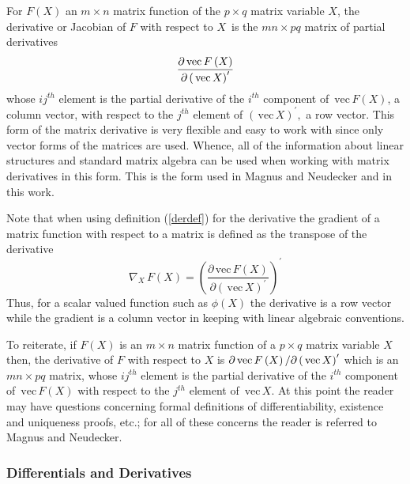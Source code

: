 \documentclass[12pt,thmsa,suthesis,verbatim]{report}
\begin{document}
For $F\left( X\right) $ an $m\times n$ matrix function of the $p\times q$
matrix variable $X$, the derivative or Jacobian of $F$ with respect to $X\,$
is the $mn\times pq$ matrix of partial derivatives 
\begin{equation}
\frac{\partial \,\mathrm{vec}\,F\left( X\right) }{\partial \left( \,\mathrm{%
vec}\,X\right) ^{\prime }}  \label{derdef}
\end{equation}
whose $ij^{th}$ element is the partial derivative of the $i^{th}$ component
of $\,\mathrm{vec}\,F\left( X\right) $, a column vector, with respect to the 
$j^{th}$ element of $\left( \,\mathrm{vec}\,X\right) ^{\prime },$ a row
vector. This form of the matrix derivative is very flexible and easy to work
with since only vector forms of the matrices are used. Whence, all of the
information about linear structures and standard matrix algebra can be used
when working with matrix derivatives in this form. This is the form used in
Magnus and Neudecker\cite{MagNeud88} and in this work.

Note that when using definition (\ref{derdef}) for the derivative the
gradient of a matrix function with respect to a matrix is defined as the
transpose of the derivative 
\begin{equation}
\nabla _X\,F\left( X\right) =\left( \frac{\partial \,\mathrm{vec}\,F\left(
X\right) }{\partial \left( \,\mathrm{vec}\,X\right) ^{\prime }}\right)
^{\prime }
\end{equation}
Thus, for a scalar valued function such as $\phi \left( X\right) $ the
derivative is a row vector while the gradient is a column vector in keeping
with linear algebraic conventions.

To reiterate, if $F\left( X\right) $ is an $m\times n$ matrix function of a $%
p\times q$ matrix variable $X$ then, the derivative of $F$ with respect to $%
X $ is $\partial \,\mathrm{vec}\,F\left( X\right) /\partial \left( \,\mathrm{%
vec}\,X\right) ^{\prime }$ which is an $mn\times pq$ matrix, whose $ij^{th}$
element is the partial derivative of the $i^{th}$ component of $\,\mathrm{vec%
}\,F\left( X\right) $ with respect to the $j^{th}$ element of $\,\mathrm{vec}%
\,X$. At this point the reader may have questions concerning formal
definitions of differentiability, existence and uniqueness proofs, etc.; for
all of these concerns the reader is referred to Magnus and Neudecker\cite
{MagNeud88,MagNeud85}.

\subsubsection{Differentials and Derivatives}
\end{document}
